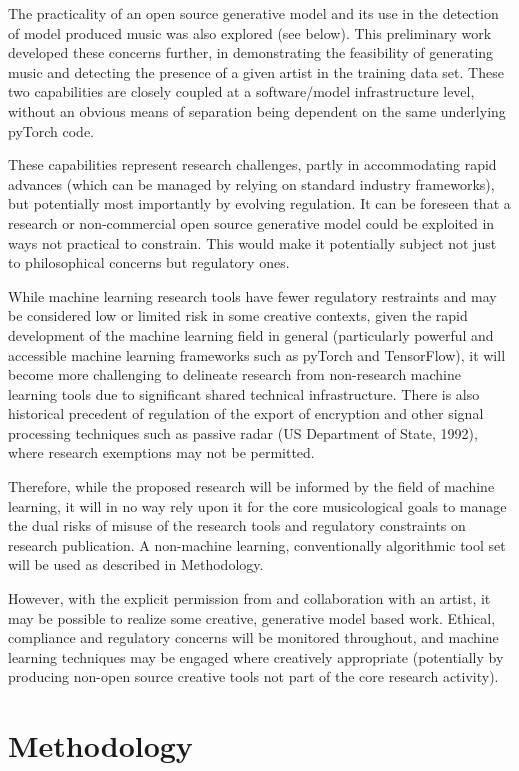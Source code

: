 \documentclass[10pt]{article}
\begin{document}
\begin{multicols*}{2}
The practicality of an open source generative model and its use in the detection of model produced music was also explored (see below). This preliminary work developed these concerns further, in demonstrating the feasibility of generating music and detecting the presence of a given artist in the training data set. These two capabilities are closely coupled at a software/model infrastructure level, without an obvious means of separation being dependent on the same underlying pyTorch code.

These capabilities represent research challenges, partly in accommodating rapid advances (which can be managed by relying on standard industry frameworks), but potentially most importantly by evolving regulation. It can be foreseen that a research or non-commercial open source generative model could be exploited in ways not practical to constrain. This would make it potentially subject not just to philosophical concerns but regulatory ones.

While machine learning research tools have fewer regulatory restraints and may be considered low or limited risk in some creative contexts, given the rapid development of the machine learning field in general (particularly powerful and accessible machine learning frameworks such as pyTorch and TensorFlow), it will become more challenging to delineate research from non-research machine learning tools due to significant shared technical infrastructure. There is also historical precedent of regulation of the export of encryption and other signal processing techniques such as passive radar (US Department of State, 1992), where research exemptions may not be permitted.

Therefore, while the proposed research will be informed by the field of machine learning, it will in no way rely upon it for the core musicological goals to manage the dual risks of misuse of the research tools and regulatory constraints on research publication. A non-machine learning, conventionally algorithmic tool set will be used as described in Methodology.

However, with the explicit permission from and collaboration with an artist, it may be possible to realize some creative, generative model based work. Ethical, compliance and regulatory concerns will be monitored throughout, and machine learning techniques may be engaged where creatively appropriate (potentially by producing non-open source creative tools not part of the core research activity).

  \section{Methodology}


\end{multicols*}
\end{document}
